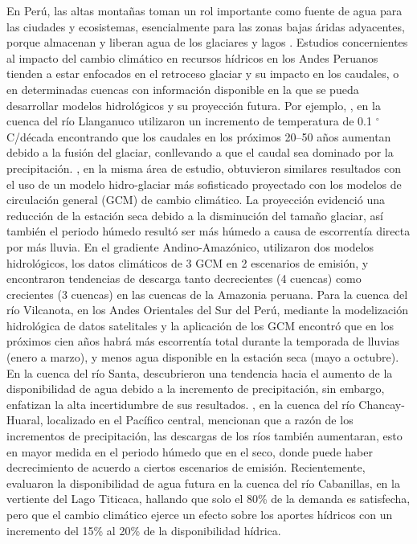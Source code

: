 \documentclass[12pt]{article}
\begin{document}
En Perú, las altas montañas toman un rol importante como fuente de agua para las ciudades y ecosistemas, esencialmente para las zonas bajas áridas adyacentes, porque almacenan y liberan agua de los glaciares y lagos \citep{Coudrain2005,barnett2005potential,Viviroli2011}. Estudios concernientes al impacto del cambio climático en recursos hídricos en los Andes Peruanos tienden a estar enfocados en el retroceso glaciar \citep{VUILLE2018195,drenkhan2018current} y su impacto en los caudales, o en determinadas cuencas con información disponible en la que se pueda desarrollar modelos hidrológicos y su proyección futura. Por ejemplo, \citet{Pouyaud2005}, en la cuenca del río Llanganuco utilizaron un incremento de temperatura de 0.1 $^{\circ}$C/década encontrando que los caudales en los próximos 20–50 años aumentan debido a la fusión del glaciar, conllevando a que el caudal sea dominado por la precipitación. \citet{Juen2007}, en la misma área de estudio, obtuvieron similares resultados con el uso de un modelo hidro-glaciar más sofisticado proyectado con los modelos de circulación general (GCM) de cambio climático. La proyección evidenció una reducción de la estación seca debido a la disminución del tamaño glaciar, así también el periodo húmedo resultó ser más húmedo a causa de escorrentía directa por más lluvia. En el gradiente Andino-Amazónico, \citet{LavadoCasimiro2011} utilizaron dos modelos hidrológicos, los datos climáticos de 3 GCM en 2 escenarios de emisión, y encontraron tendencias de descarga tanto decrecientes (4 cuencas) como crecientes (3 cuencas) en las cuencas de la Amazonia peruana. Para la cuenca del río Vilcanota, en los Andes Orientales del Sur del Perú, \citet{Andres2014} mediante la modelización hidrológica de datos satelitales y la aplicación de los GCM encontró que en los próximos cien años habrá más escorrentía total durante la temporada de lluvias (enero a marzo), y menos agua disponible en la estación seca (mayo a octubre). En la cuenca del río Santa, \citet{VanSoesbergen2016} descubrieron una tendencia hacia el aumento de la disponibilidad de agua debido a la incremento de precipitación, sin embargo, enfatizan la alta incertidumbre de sus resultados. \citet{Olsson2017}, en la cuenca del río Chancay-Huaral, localizado en el Pacífico central, mencionan que a razón de los incrementos de precipitación, las descargas de los ríos también aumentaran, esto en mayor medida en el periodo húmedo que en el seco, donde puede haber decrecimiento de acuerdo a ciertos escenarios de emisión. Recientemente, \citet{Pilares2018} evaluaron la disponibilidad de agua futura en la cuenca del río Cabanillas, en la vertiente del Lago Titicaca, hallando que solo el 80\% de la demanda es satisfecha, pero que el cambio climático ejerce un efecto sobre los aportes hídricos con un incremento del 15\% al 20\% de la disponibilidad hídrica. 
\end{document}
